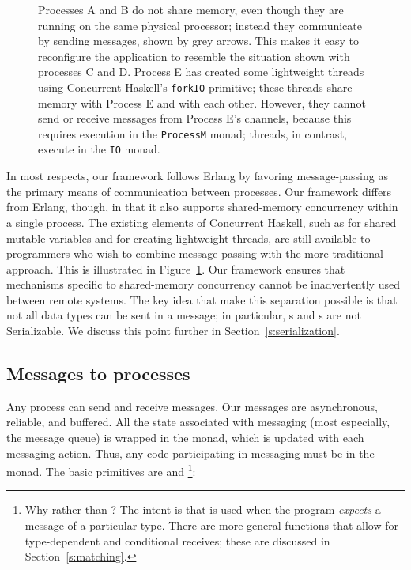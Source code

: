 \documentclass[preprint]{sigplanconf}
\begin{document}
\begin{figure}[!b]
{}
\caption{ 
\label{fig:ProcessBubbles}
Processes A and B do not share memory, even though they are running on the same physical processor; instead they communicate by sending messages, shown by grey arrows.  This makes it easy to reconfigure the application to resemble the situation shown with processes C and D.  Process E has created some lightweight threads using Concurrent Haskell's \texttt{forkIO} primitive; these threads share memory with Process E and with each other.  However, they cannot send or receive messages from Process E's channels, because this requires execution in the \texttt{ProcessM} monad; threads, in contrast, execute in the \texttt{IO} monad.
}
\end{figure}

In most respects, our framework follows Erlang by favoring message-passing as the primary means of communication between processes. Our framework differs from Erlang, though, in that it also supports shared-memory concurrency within a single process. The existing elements of Concurrent Haskell, such as  for shared mutable variables and  for creating lightweight threads, are still available to programmers who wish to combine message passing with the more traditional approach. This is illustrated in Figure~\ref{fig:ProcessBubbles}. Our framework ensures that mechanisms specific to shared-memory concurrency cannot be inadvertently used between remote systems.  The key idea that make this separation possible is that not all data types can be sent in a message; in particular, s and s are not Serializable.
We discuss this point further in Section~\ref{s:serialization}.

\subsection{Messages to processes}
\label{s:sendAndExpect}

Any process can send and receive messages. Our messages are asynchronous, reliable, and buffered.  All the state associated with messaging (most especially, the message queue) is wrapped in the  monad, which is updated with each messaging action. Thus, any code participating in messaging must be in the  monad.  The basic primitives are  and \footnote{Why  rather than ?  The intent is that  is used when the program \emph{expects} a message of a particular type.  
There are more general  functions that allow for type-dependent and conditional receives;  these are discussed in Section~\ref{s:matching}.}:
\end{document}
